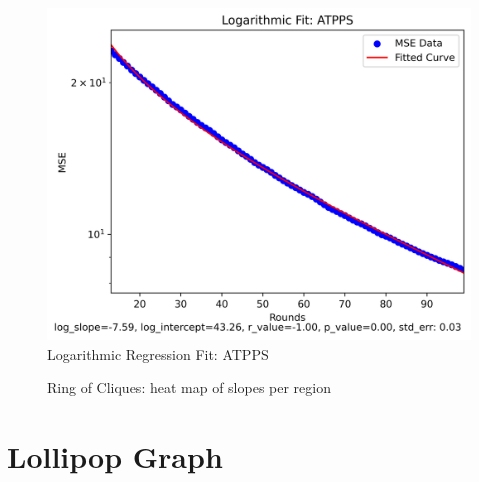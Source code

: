\begin{figure}[H]
    \centering
    \includegraphics[width=\linewidth]{figures/Simulation_outcomes/RingOfCliques/ATPPS/ATPPS_modelfitting_rounds_99_model_3.png}
    \caption{Logarithmic Regression Fit: ATPPS}
    \label{fig:atppsRingOfCliquesModelFit}
\end{figure}

\begin{figure}
    \centering
    \caption{Ring of Cliques: heat map of slopes per region}
    \label{fig:ringOfCliquesslopes}
\end{figure}

\section{Lollipop Graph}\label{sec:lollipopgraph}
